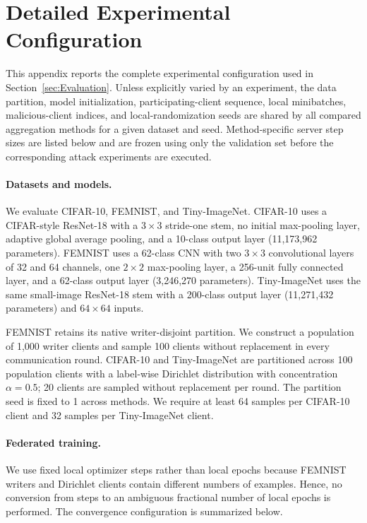 \section{Detailed Experimental Configuration}
\label{app:exp-config}

This appendix reports the complete experimental configuration used in
Section~\ref{sec:Evaluation}. Unless explicitly varied by an experiment, the
data partition, model initialization, participating-client sequence, local
minibatches, malicious-client indices, and local-randomization seeds are shared
by all compared aggregation methods for a given dataset and seed. Method-specific
server step sizes are listed below and are frozen using only the validation set
before the corresponding attack experiments are executed.

\paragraph{Datasets and models.}
We evaluate CIFAR-10, FEMNIST, and Tiny-ImageNet. CIFAR-10 uses a CIFAR-style
ResNet-18 with a $3\times3$ stride-one stem, no initial max-pooling layer,
adaptive global average pooling, and a 10-class output layer (11,173,962
parameters). FEMNIST uses a 62-class CNN with two $3\times3$ convolutional
layers of 32 and 64 channels, one $2\times2$ max-pooling layer, a 256-unit
fully connected layer, and a 62-class output layer (3,246,270 parameters).
Tiny-ImageNet uses the same small-image ResNet-18 stem with a 200-class output
layer (11,271,432 parameters) and $64\times64$ inputs.

FEMNIST retains its native writer-disjoint partition. We construct a population
of 1,000 writer clients and sample 100 clients without replacement in every
communication round. CIFAR-10 and Tiny-ImageNet are partitioned across 100
population clients with a label-wise Dirichlet distribution with concentration
$\alpha=0.5$; 20 clients are sampled without replacement per round. The
partition seed is fixed to 1 across methods. We require at least 64 samples per
CIFAR-10 client and 32 samples per Tiny-ImageNet client.

\paragraph{Federated training.}
We use fixed local optimizer steps rather than local epochs because FEMNIST
writers and Dirichlet clients contain different numbers of examples. Hence,
no conversion from steps to an ambiguous fractional number of local epochs is
performed. The convergence configuration is summarized below.

